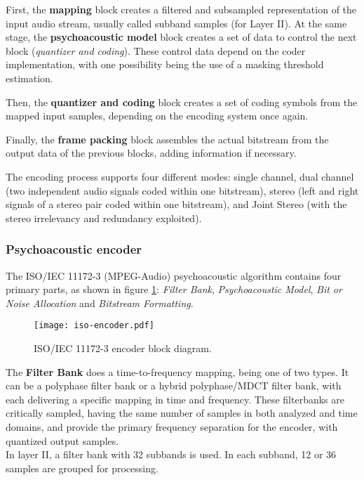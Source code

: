 First, the \textbf{mapping} block creates a filtered and subsampled representation of the input audio stream, usually called subband samples (for Layer II). At the same stage, the \textbf{psychoacoustic model} block creates a set of data to control the next block (\textit{quantizer and coding}). These control data depend on the coder implementation, with one possibility being the use of a masking threshold estimation.

Then, the \textbf{quantizer and coding} block creates a set of coding symbols from the mapped input samples, depending on the encoding system once again. 

Finally, the \textbf{frame packing} block assembles the actual bitstream from the output data of the previous blocks, adding information if necessary.

The encoding process supports four different modes: single channel, dual channel (two independent audio signals coded within one bitstream), stereo (left and right signals of a stereo pair coded within one bitstream), and Joint Stereo (with the stereo irrelevancy and redundancy exploited).

\subsubsection{Psychoacoustic encoder}

The ISO/IEC 11172-3 (MPEG-Audio) psychoacoustic algorithm contains four primary parts, as shown in figure \ref{fig:algorithm}: \textit{Filter Bank}, \textit{Psychoacoustic Model}, \textit{Bit or Noise Allocation} and \textit{Bitstream Formatting}.

\begin{figure}[H]
\centerline{\texttt{[image: iso-encoder.pdf]}}
\caption{ISO/IEC 11172-3 encoder block diagram.}
\label{fig:algorithm}
\end{figure}

The \textbf{Filter Bank} does a time-to-frequency mapping, being one of two types. It can be a polyphase filter bank or a hybrid polyphase/MDCT filter bank, with each delivering a specific mapping in time and frequency.
These filterbanks are critically sampled, having the same number of samples in both analyzed and time domains, and provide the primary frequency separation for the encoder, with quantized output samples. \\
In layer II, a filter bank with 32 subbands is used. In each subband, 12 or 36 samples are grouped for processing.

